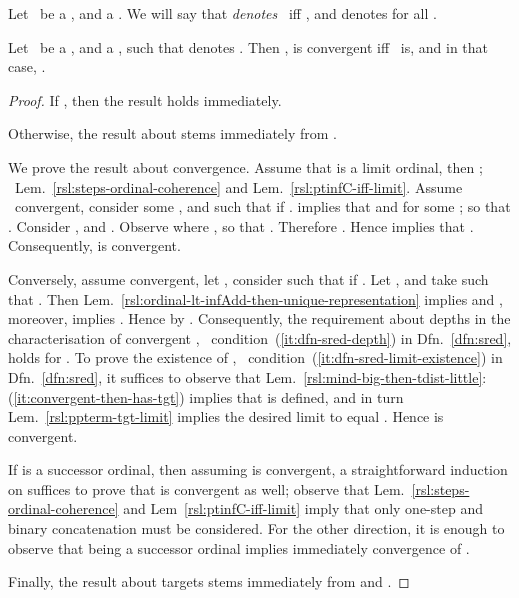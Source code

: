 \begin{definition}
\label{dfn:redseq-denotation}
Let \reda\ be a \redseq, and  a \pnpterm. 
We will say that  \emph{denotes} \reda\ iff ,  and  denotes  for all .
\end{definition}


\begin{lemma}
\label{rsl:redseq-denotation-implications}
Let \reda\ be a \redseq, and  a \pnpterm, such that  denotes \reda.
Then ,  is convergent iff \reda\ is, and in that case, .
\end{lemma}

\begin{proof}
If , then the result holds immediately.

Otherwise, the result about  stems immediately from .

We prove the result about convergence.
Assume that  is a limit ordinal, then ; \confer\ Lem.~\ref{rsl:steps-ordinal-coherence} and Lem.~\ref{rsl:ptinfC-iff-limit}.
Assume \reda\ convergent, consider some , and  such that  if .
 implies that  and  for some ; so that .
Consider , and . Observe  where , so that . Therefore .
Hence  implies that . Consequently,  is convergent.

Conversely, assume  convergent, let , consider  such that  if . 
Let , and take  such that . 
Then Lem.~\ref{rsl:ordinal-lt-infAdd-then-unique-representation} implies  and , moreover,  implies .
Hence  by . Consequently, the requirement about depths in the characterisation of convergent \redseqs, \ie\ condition~(\ref{it:dfn-sred-depth}) in Dfn.~\ref{dfn:sred}, holds for \reda.
To prove the existence of , \ie\ condition~(\ref{it:dfn-sred-limit-existence}) in Dfn.~\ref{dfn:sred}, it suffices to observe that Lem.~\ref{rsl:mind-big-then-tdist-little}:(\ref{it:convergent-then-has-tgt}) implies that  is defined, and in turn Lem.~\ref{rsl:ppterm-tgt-limit} implies the desired limit to equal . Hence  is convergent.

If  is a successor ordinal, then assuming  is convergent, a straightforward induction on  suffices to prove that  is convergent as well; observe that Lem.~\ref{rsl:steps-ordinal-coherence} and Lem~\ref{rsl:ptinfC-iff-limit} imply that only one-step and binary concatenation must be considered. For the other direction, it is enough to observe that  being a successor ordinal implies immediately convergence of .

Finally, the result about targets stems immediately from  and .
\end{proof}


